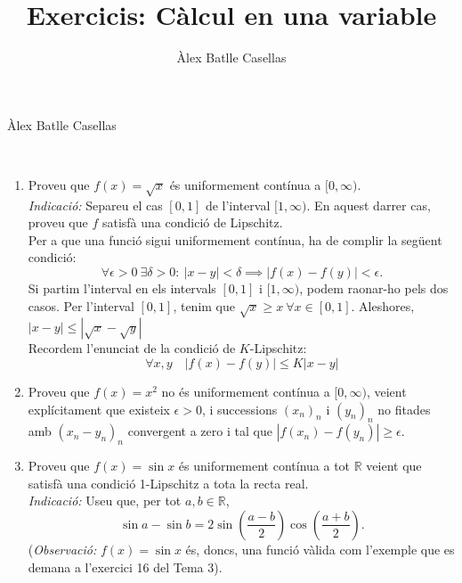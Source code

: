 \documentclass[11pt]{article}
\title{Exercicis: Càlcul en una variable}
\author{Àlex Batlle Casellas}
\begin{document}
\begin{small}
Àlex Batlle Casellas
\end{small}\\
\begin{enumerate}
	\item Proveu que $f(x)=\sqrt{x}$ és uniformement contínua a $[0,\infty)$.\\
	\textit{Indicació:} Separeu el cas $[0,1]$ de l'interval $[1,\infty)$. En aquest darrer cas, proveu que $f$ satisfà una condició de Lipschitz.\\
	Per a que una funció sigui uniformement contínua, ha de complir la següent condició:
	$$\forall\epsilon>0\ \exists\delta>0:\ |x-y|<\delta\implies|f(x)-f(y)|<\epsilon.$$
	Si partim l'interval en els intervals $[0,1]$ i $[1,\infty)$, podem raonar-ho pels dos casos. Per l'interval $[0,1]$, tenim que $\sqrt{x}\geq x\ \forall x\in[0,1]$. Aleshores, $|x-y|\leq|\sqrt{x}-\sqrt{y}|$\\
	Recordem l'enunciat de la condició de $K$-Lipschitz:
	$$\forall x,y\quad |f(x)-f(y)|\leq K|x-y|$$
	\item Proveu que $f(x)=x^2$ no és uniformement contínua a $[0,\infty)$, veient explícitament que existeix $\epsilon>0$, i successions $(x_n)_n$ i $(y_n)_n$ no fitades amb $(x_n-y_n)_n$ convergent a zero i tal que $|f(x_n)-f(y_n)|\geq\epsilon$.\\
	\item Proveu que $f(x)=\sin x$ és uniformement contínua a tot $\mathbb{R}$ veient que satisfà una condició 1-Lipschitz a tota la recta real.\\
	\textit{Indicació:} Useu que, per tot $a,b\in\mathbb{R}$,
	$$\sin{a}-\sin{b}=2\sin{\left(\dfrac{a-b}{2}\right)}\cos{\left(\dfrac{a+b}{2}\right)}.$$
	(\textit{Observació:} $f(x)=\sin{x}$ és, doncs, una funció vàlida com l'exemple que es demana a l'exercici 16 del Tema 3).
\end{enumerate}
\end{document}
